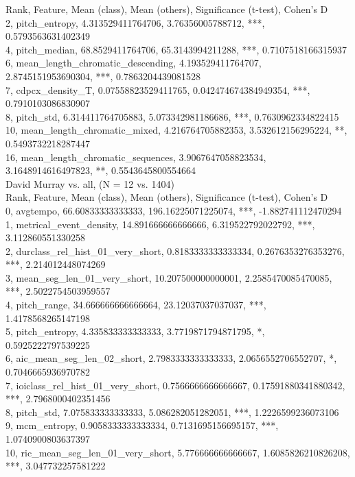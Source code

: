 Rank, Feature, Mean (class), Mean (others), Significance (t-test), Cohen's D\\
2, pitch_entropy, 4.313529411764706, 3.76356005788712, ***, 0.5793563631402349\\
4, pitch_median, 68.8529411764706, 65.3143994211288, ***, 0.7107518166315937\\
6, mean_length_chromatic_descending, 4.193529411764707, 2.8745151953690304, ***, 0.7863204439081528\\
7, cdpcx_density_T, 0.07558823529411765, 0.042474674384949354, ***, 0.7910103086830907\\
8, pitch_std, 6.314411764705883, 5.073342981186686, ***, 0.7630962334822415\\
10, mean_length_chromatic_mixed, 4.216764705882353, 3.532612156295224, **, 0.5493732218287447\\
16, mean_length_chromatic_sequences, 3.9067647058823534, 3.1648914616497823, **, 0.5543645800554664\\
David Murray vs. all, (N = 12 vs. 1404)\\
Rank, Feature, Mean (class), Mean (others), Significance (t-test), Cohen's D\\
0, avgtempo, 66.60833333333333, 196.16225071225074, ***, -1.882741112470294\\
1, metrical_event_density, 14.891666666666666, 6.319522792022792, ***, 3.112860551330258\\
2, durclass_rel_hist_01_very_short, 0.8183333333333334, 0.2676353276353276, ***, 2.214012448074269\\
3, mean_seg_len_01_very_short, 10.207500000000001, 2.2585470085470085, ***, 2.5022754503959557\\
4, pitch_range, 34.666666666666664, 23.12037037037037, ***, 1.4178568265147198\\
5, pitch_entropy, 4.335833333333333, 3.7719871794871795, *, 0.5925222797539225\\
6, aic_mean_seg_len_02_short, 2.7983333333333333, 2.0656552706552707, *, 0.7046665936970782\\
7, ioiclass_rel_hist_01_very_short, 0.7566666666666667, 0.17591880341880342, ***, 2.7968000402351456\\
8, pitch_std, 7.075833333333333, 5.086282051282051, ***, 1.2226599236073106\\
9, mcm_entropy, 0.9058333333333334, 0.7131695156695157, ***, 1.0740900803637397\\
10, ric_mean_seg_len_01_very_short, 5.776666666666667, 1.6085826210826208, ***, 3.047732257581222\\
